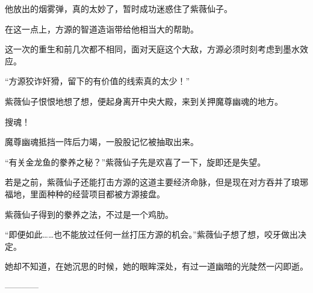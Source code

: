 \begin{this_body}
他放出的烟雾弹，真的太妙了，暂时成功迷惑住了紫薇仙子。

在这一点上，方源的智道造诣带给他相当大的帮助。

这一次的重生和前几次都不相同，面对天庭这个大敌，方源必须时刻考虑到墨水效应。

“方源狡诈奸猾，留下的有价值的线索真的太少！”

紫薇仙子恨恨地想了想，便起身离开中央大殿，来到关押魔尊幽魂的地方。

搜魂！

魔尊幽魂抵挡一阵后力竭，一股股记忆被抽取出来。

“有关金龙鱼的豢养之秘？”紫薇仙子先是欢喜了一下，旋即还是失望。

若是之前，紫薇仙子还能打击方源的这道主要经济命脉，但是现在对方吞并了琅琊福地，里面种种的经营项目都被方源接盘。

紫薇仙子得到的豢养之法，不过是一个鸡肋。

“即便如此……也不能放过任何一丝打压方源的机会。”紫薇仙子想了想，咬牙做出决定。

她却不知道，在她沉思的时候，她的眼眸深处，有过一道幽暗的光陡然一闪即逝。

------------

\end{this_body}

